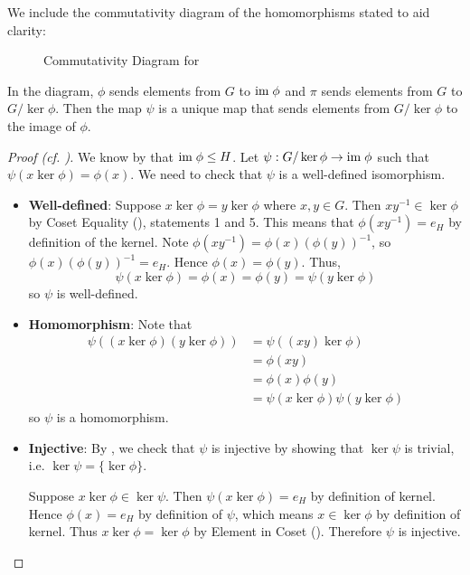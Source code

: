We include the commutativity diagram of the homomorphisms stated to aid clarity:

\begin{figure}[h]
    \centering
    \caption{Commutativity Diagram for }
\end{figure}

In the diagram, $\phi$ sends elements from $G$ to $\mathrm{im}\;\phi$ and $\pi$ sends elements from $G$ to $G/\ker\phi$. Then the map $\psi$ is a unique map that sends elements from $G/\ker\phi$ to the image of $\phi$.

\begin{proof}[Proof (cf. {\cite[p.~250, Theorem 2]{cohn_1982}})]
    We know by  that $\mathrm{im}\;\phi \leq H$. Let $\psi: G/\ker\phi \to \mathrm{im}\;\phi$ such that $\psi(x\ker\phi) = \phi(x)$. We need to check that $\psi$ is a well-defined isomorphism.
    \begin{itemize}
        \item \textbf{Well-defined}: Suppose $x\ker\phi = y\ker\phi$ where $x, y \in G$. Then $xy^{-1} \in \ker\phi$ by Coset Equality (), statements 1 and 5. This means that $\phi(xy^{-1}) = e_H$ by definition of the kernel. Note $\phi(xy^{-1}) = \phi(x)\left(\phi(y)\right)^{-1}$, so $\phi(x)\left(\phi(y)\right)^{-1} = e_H$. Hence $\phi(x) = \phi(y)$. Thus,
        \[
            \psi(x\ker\phi) = \phi(x) = \phi(y) = \psi(y\ker\phi)
        \]
        so $\psi$ is well-defined.

        \item \textbf{Homomorphism}: Note that
        \begin{align*}
            \psi((x\ker\phi)(y\ker\phi)) &= \psi((xy)\ker\phi)\\
            &= \phi(xy)\\
            &= \phi(x)\phi(y)\\
            &= \psi(x\ker\phi)\psi(y\ker\phi)
        \end{align*}
        so $\psi$ is a homomorphism.
        \item \textbf{Injective}: By , we check that $\psi$ is injective by showing that $\ker\psi$ is trivial, i.e. $\ker\psi = \{\ker\phi\}$.

        Suppose $x\ker\phi\in\ker\psi$. Then $\psi(x\ker\phi) = e_H$ by definition of kernel. Hence $\phi(x) = e_H$ by definition of $\psi$, which means $x \in \ker\phi$ by definition of kernel. Thus $x\ker\phi = \ker\phi$ by Element in Coset (). Therefore $\psi$ is injective.


\end{itemize}
\end{proof}
